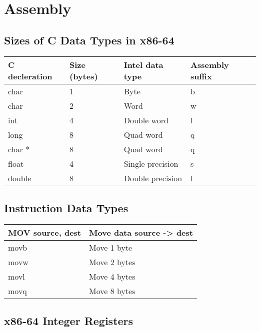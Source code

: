 \section*{Assembly}

\subsection*{Sizes of C Data Types in x86-64}

\begin{tabular}{| l | l | l | l |}
    \hline
    C decleration & Size (bytes) & Intel data type & Assembly suffix \\
    \hline
    char & 1 & Byte & b \\
    char & 2 & Word & w \\
    int & 4 & Double word & l \\
    long & 8 & Quad word & q \\
    char * & 8 & Quad word & q \\
    float & 4 & Single precision & s \\
    double & 8 & Double precision & l \\
    \hline
\end{tabular}

\subsection*{Instruction Data Types}


\begin{tabular}{| l | l |}
    \hline
    MOV source, dest & Move data source -> dest \\
    \hline
    movb & Move 1 byte \\
    movw & Move 2 bytes \\
    movl & Move 4 bytes \\
    movq & Move 8 bytes \\
    \hline
\end{tabular}

\newpage

\subsection*{x86-64 Integer Registers}


